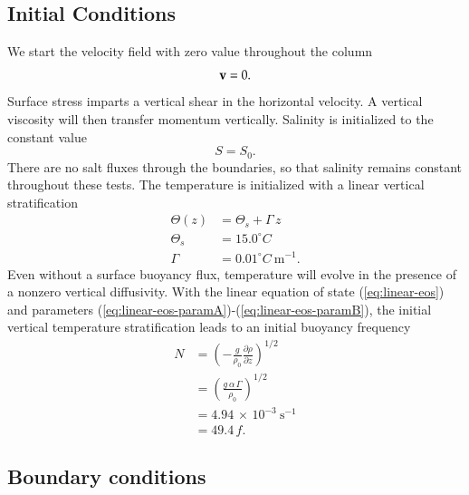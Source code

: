 \subsection{Initial Conditions}

We start the velocity field with zero value throughout the column
\begin{equation}
 {\bf v} = 0.
\end{equation}
Surface stress imparts a vertical shear in the horizontal velocity.  A
vertical viscosity will then transfer momentum vertically.  Salinity
is initialized to the constant value
\begin{equation}
 S = S_{0}.
\end{equation}
There are no salt fluxes through the boundaries, so that salinity
remains constant throughout these tests.  The temperature is
initialized with a linear vertical stratification
\begin{subequations}
\begin{align}
 \Theta(z) &= \Theta_s + \Gamma \, z  
\\
 \Theta_s &= 15.0^{\circ}C 
\label{eq:thetas}
\\
 \Gamma  &= 0.01^{\circ}C~\mbox{m}^{-1}. 
\end{align}
\end{subequations}
Even without a surface buoyancy flux, temperature will evolve in the
presence of a nonzero vertical diffusivity.  With the linear equation
of state (\ref{eq:linear-eos}) and parameters
(\ref{eq:linear-eos-paramA})-(\ref{eq:linear-eos-paramB}), the initial
vertical temperature stratification leads to an initial buoyancy
frequency
\begin{subequations}
\begin{align}
 N &= \left(-\frac{g}{\rho_{0}} \frac{\partial \rho}{\partial z} \right)^{1/2}
 \\
   &= \left( \frac{g \, \alpha \, \Gamma}{\rho_{0}} \right)^{1/2}
\\
  &= 4.94 \, \times \, 10^{-3}~\mbox{s}^{-1}
 \\
 &= 49.4 \, f.
\end{align}
\end{subequations}


\subsection{Boundary conditions}

